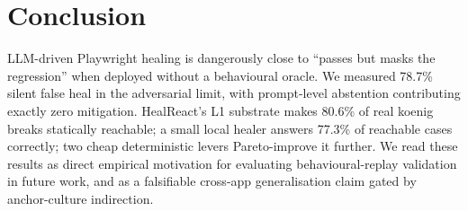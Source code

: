 \section{Conclusion}
\label{sec:conclusion}

LLM-driven Playwright healing is dangerously close to ``passes but masks the regression'' when deployed without a behavioural oracle. We measured 78.7\% silent false heal in the adversarial limit, with prompt-level abstention contributing exactly zero mitigation. HealReact's L1 substrate makes 80.6\% of real koenig breaks statically reachable; a small local healer answers 77.3\% of reachable cases correctly; two cheap deterministic levers Pareto-improve it further. We read these results as direct empirical motivation for evaluating behavioural-replay validation in future work, and as a falsifiable cross-app generalisation claim gated by anchor-culture indirection.
